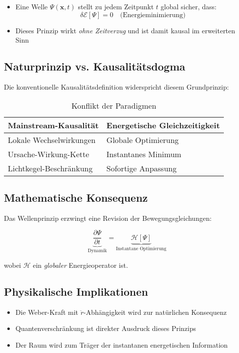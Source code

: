 \begin{itemize}
    \item Eine Welle $\Psi(\mathbf{x},t)$ stellt zu jedem Zeitpunkt $t$ global sicher, dass:
    \begin{equation}
        \delta \mathcal{E}[\Psi] = 0 \quad \text{(Energieminimierung)}
    \end{equation}
    
    \item Dieses Prinzip wirkt \emph{ohne Zeitverzug} und ist damit kausal im erweiterten Sinn
\end{itemize}

\subsection{Naturprinzip vs. Kausalitätsdogma}
Die konventionelle Kausalitätsdefinition widerspricht diesem Grundprinzip:

\begin{table}[h]
    \centering
    \begin{tabular}{ll}
        \toprule
        \textbf{Mainstream-Kausalität} & \textbf{Energetische Gleichzeitigkeit} \\
        \midrule
        Lokale Wechselwirkungen & Globale Optimierung \\
        Ursache-Wirkung-Kette & Instantanes Minimum \\
        Lichtkegel-Beschränkung & Sofortige Anpassung \\
        \bottomrule
    \end{tabular}
    \caption{Konflikt der Paradigmen}
\end{table}

\subsection{Mathematische Konsequenz}
Das Wellenprinzip erzwingt eine Revision der Bewegungsgleichungen:

\begin{equation}
    \underbrace{\frac{\partial \Psi}{\partial t}}_{\text{Dynamik}} = 
    \underbrace{\mathcal{H}[\Psi]}_{\text{Instantane Optimierung}}
\end{equation}

wobei $\mathcal{H}$ ein \emph{globaler} Energieoperator ist.

\subsection{Physikalische Implikationen}
\begin{itemize}
    \item Die Weber-Kraft mit $\ddot{r}$-Abhängigkeit wird zur natürlichen Konsequenz
    \item Quantenverschränkung ist direkter Ausdruck dieses Prinzips
    \item Der Raum wird zum Träger der instantanen energetischen Information
\end{itemize}
